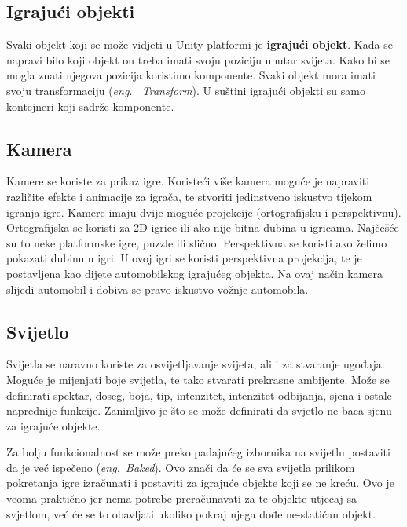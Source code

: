 \subsection{Igrajući objekti}
Svaki objekt koji se može vidjeti u Unity platformi je \textbf{igrajući objekt}. Kada se napravi bilo koji objekt on treba imati svoju poziciju unutar svijeta. Kako bi se mogla znati njegova pozicija koristimo komponente. Svaki objekt mora imati svoju transformaciju (\emph{eng.~ Transform}). U suštini igrajući objekti su samo kontejneri koji sadrže komponente.

\subsection{Kamera}
Kamere se koriste za prikaz igre. Koristeći više kamera moguće je napraviti različite efekte i animacije za igrača, te stvoriti jedinstveno iskustvo tijekom igranja igre. Kamere imaju dvije moguće projekcije (ortografijsku i perspektivnu). Ortografijska se koristi za 2D igrice ili ako nije bitna dubina u igricama. Najčešće su to neke platformske igre, puzzle ili slično. Perspektivna se koristi ako želimo pokazati dubinu u igri. U ovoj igri se koristi perspektivna projekcija, te je postavljena kao dijete automobilskog igrajućeg objekta. Na ovaj način kamera slijedi automobil i dobiva se pravo iskustvo vožnje automobila.
\subsection{Svijetlo}
Svijetla se naravno koriste za osvijetljavanje svijeta, ali i za stvaranje ugođaja. Moguće je mijenjati boje svijetla, te tako stvarati prekrasne ambijente. Može se definirati spektar, doseg, boja, tip, intenzitet, intenzitet odbijanja, sjena i ostale naprednije funkcije. Zanimljivo je što se može definirati da svjetlo ne baca sjenu za igrajuće objekte.

Za bolju funkcionalnost se može preko padajućeg izbornika na svijetlu postaviti da je već ispečeno (\emph{eng.~Baked}). Ovo znači da će se sva svijetla prilikom pokretanja igre izračunati i postaviti za igrajuće objekte koji se ne kreću. Ovo je veoma praktično jer nema potrebe preračunavati za te objekte utjecaj sa svjetlom, već će se to obavljati ukoliko pokraj njega dođe ne-statičan objekt.
\newpage

